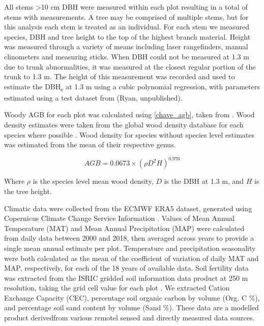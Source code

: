 \documentclass[11pt,a4paper]{article}
\begin{document}
All stems >10 cm DBH were measured within each plot resulting in a total of \nstems{} stems with measurements. A tree may be comprised of multiple stems, but for this analysis each stem is treated as an individual. For each stem we measured species, DBH and tree height to the top of the highest branch material. Height was measured through a variety of means including laser rangefinders, manual clinometers and measuring sticks. When DBH could not be measured at 1.3 m due to trunk abnormalities, it was measured at the closest regular portion of the trunk to 1.3 m. The height of this measurement was recorded and used to estimate the DBH\textsubscript{e} at 1.3 m using a cubic polynomial regression, with parameters estimated using a test dataset from (Ryan, unpublished).

Woody AGB for each plot was calculated using \autoref{chave_agb}, taken from \citet{Chave2014}. Wood density estimates were taken from the global wood density database for each species where possible \citep{Chave2009, Zanne2009}. Wood density for species without species level estimates was estimated from the mean of their respective genus. 

\begin{equation}
	AGB = 0.0673 \times (\rho D^{2} H)^{0.976}
	\label{chave_agb}
\end{equation}

Where $\rho$ is the species level mean wood density, $D$ is the DBH at 1.3 m, and $H$ is the tree height.

Climatic data were collected from the ECMWF ERA5 dataset, generated using Copernicus Climate Change Service Information \citep{ERA5}. Values of Mean Annual Temperature (MAT) and Mean Annual Precipitation (MAP) were calculated from daily data between 2000 and 2018, then averaged across years to provide a single mean annual estimate per plot. Temperature and precipitation seasonality were both calculated as the mean of the coefficient of variation of daily MAT and MAP, respectively, for each of the 18 years of available data. Soil fertility data was extracted from the ISRIC gridded soil information data product at 250 m resolution, taking the grid cell value for each plot \citep{Hengl2017}. We extracted Cation Exchange Capacity (CEC), percentage soil organic carbon by volume (Org. C \%), and percentage soil sand content by volume (Sand \%). These data are a modelled product derivedfrom various remotel sensed and directly measured data sources. 

% 
% 
\end{document}
